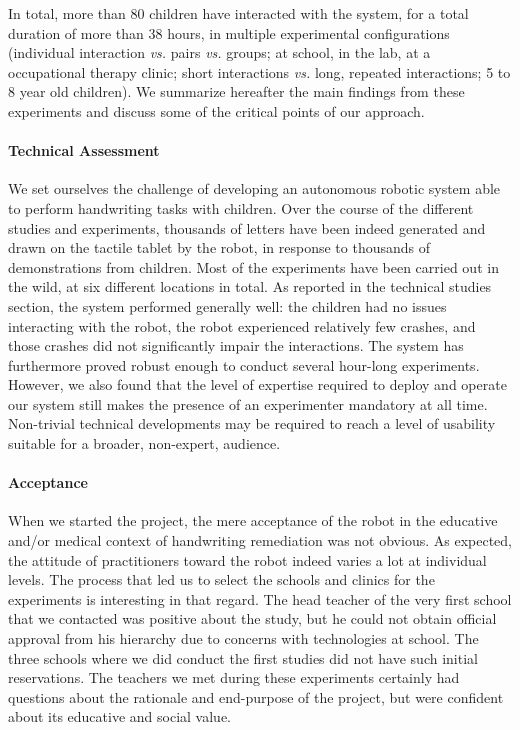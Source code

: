 \documentclass{article}
\newcommand{\vs}{\textit{vs.}\xspace}
\begin{document}
In total, more than 80 children have interacted with the system, for a total
duration of more than 38 hours, in multiple experimental configurations
(individual interaction \vs pairs \vs groups; at school, in the lab, at a
occupational therapy clinic; short interactions \vs long, repeated interactions; 5 to 8 year old
children). We summarize hereafter the main findings from these experiments and
discuss some of the critical points of our approach.

\paragraph{Technical Assessment} We set ourselves the challenge of developing an
autonomous robotic system able to perform handwriting tasks with children.
Over the course of the different studies and experiments, thousands of
letters have been indeed generated and drawn on the tactile tablet by the robot, in
response to thousands of demonstrations from children. Most of the experiments have been
carried out in the wild, at six different locations in total. As reported in the
technical studies section, the system performed generally well: the children had no
issues interacting with the robot, the robot experienced relatively few crashes,
and those crashes did not significantly impair the interactions. The system
has furthermore proved robust enough to conduct several hour-long experiments.
However, we also found that the level of expertise required to deploy and
operate our system still makes the presence of an experimenter mandatory at all
time. Non-trivial technical developments may be required to reach a level of
usability suitable for a broader, non-expert, audience.

\paragraph{Acceptance} When we started the project, the mere acceptance of the
robot in the educative and/or medical context of handwriting remediation was not
obvious. As expected, the attitude of practitioners toward the robot indeed
varies a lot at individual levels. The process that led us to select the schools
and clinics for the experiments is interesting in that regard.  The head teacher
of the very first school that we contacted was positive about the study, but he
could not obtain official approval from his hierarchy due to concerns with
technologies at school. The three schools where we did conduct the first studies
did not have such initial reservations. The teachers we met during these
experiments certainly had questions about the rationale and end-purpose of the
project, but were confident about its educative and social value.
\end{document}
